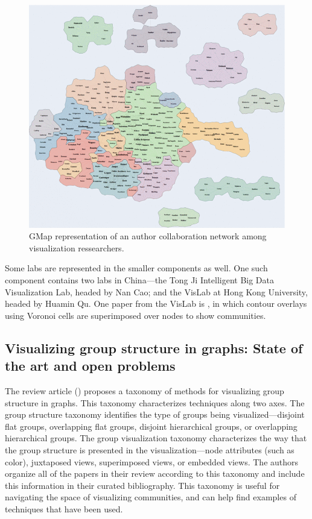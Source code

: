 \begin{figure}
\centering
\includegraphics{img/ganser2010_fig6_gmap.png}
\caption{GMap \autocite{gansner_gmap:_2010} representation of an author
collaboration network among visualization ressearchers.}\label{fig:gmap}
\end{figure}

Some labs are represented in the smaller components as well. One such
component contains two labs in China---the Tong Ji Intelligent Big Data
Visualization Lab, headed by Nan Cao; and the VisLab at Hong Kong
University, headed by Huamin Qu. One paper from the VisLab is
\autocite{wu_interactive_2015}, in which contour overlays using Voronoi
cells are superimposed over nodes to show communities.

\subsection{Visualizing group structure in graphs: State of the art and
open
problems}\label{visualizing-group-structure-in-graphs-state-of-the-art-and-open-problems}

The review article (\autocite{vehlow_state_2015}) proposes a taxonomy of
methods for visualizing group structure in graphs. This taxonomy
characterizes techniques along two axes. The group structure taxonomy
identifies the type of groups being visualized---disjoint flat groups,
overlapping flat groups, disjoint hierarchical groups, or overlapping
hierarchical groups. The group visualization taxonomy characterizes the
way that the group structure is presented in the visualization---node
attributes (such as color), juxtaposed views, superimposed views, or
embedded views. The authors organize all of the papers in their review
according to this taxonomy and include this information in their curated
bibliography. This taxonomy is useful for navigating the space of
visualizing communities, and can help find examples of techniques that
have been used.

